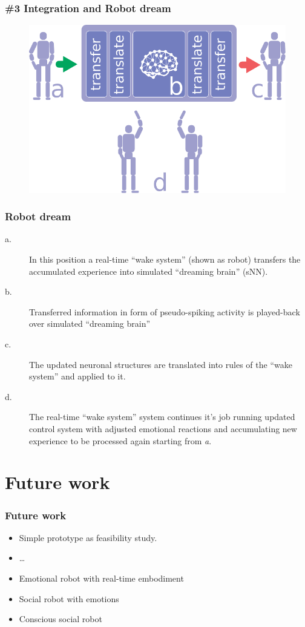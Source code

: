 \documentclass[12pt, aspectratio=169]{beamer}
\begin{document}
\begin{frame}
\frametitle{\#3 Integration and Robot dream}
\begin{figure}
\includegraphics[width=0.8\linewidth]{robot-dream}
\end{figure}
\end{frame}


\begin{frame}
\frametitle{Robot dream}
\begin{description}
  \item[a.] In this position a real-time ``wake system'' (shown as robot) transfers the accumulated experience into simulated ``dreaming brain'' (sNN).
  \item[b.] Transferred information in form of pseudo-spiking activity is played-back over simulated ``dreaming brain''
  \item[c.] The updated neuronal structures are translated into rules  of the ``wake system'' and applied to it.
  \item[d.] The real-time ``wake system'' system continues it's job running updated control system with adjusted emotional reactions and accumulating new experience to be processed again starting from \emph{a}.
  \end{description}
\end{frame}

\section{Future work}

\begin{frame}
  \frametitle{Future work}
  
\begin{itemize}
  \item Simple prototype as feasibility study.
  \item \ldots\
  \item Emotional robot with real-time embodiment
  \item Social robot with emotions
  \item Conscious social robot
\end{itemize}

\end{frame}

\end{document}
